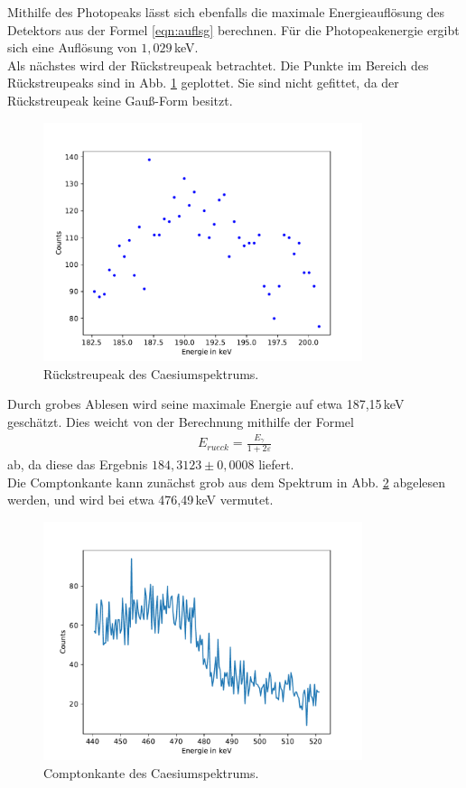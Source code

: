     Mithilfe des Photopeaks lässt sich ebenfalls die maximale Energieauflösung
    des Detektors aus der Formel \eqref{eqn:auflsg}
    berechnen. Für die Photopeakenergie ergibt sich eine Auflösung
    von $1,029\,$keV.\\

    Als nächstes wird der Rückstreupeak betrachtet.
    Die Punkte im Bereich des Rückstreupeaks sind in Abb. \ref{fig:rueck}
    geplottet. Sie sind nicht gefittet, da der Rückstreupeak keine
    Gauß-Form besitzt.

    \begin{figure}[H]
      \centering
      \includegraphics[height=7cm]{germanib/rueck/rueckenergie.pdf}
      \caption{Rückstreupeak des Caesiumspektrums.}
      \label{fig:rueck}
    \end{figure}

    Durch grobes Ablesen wird seine maximale Energie auf etwa 187,15\,keV
    geschätzt.
    Dies weicht von der Berechnung mithilfe der Formel
    \begin{align*}
      E_{rueck} = \frac{E_{\gamma}}{1+2\varepsilon}
    \end{align*}
    ab, da diese das Ergebnis $184,3123\pm 0,0008$ liefert. \\
    Die Comptonkante kann zunächst grob aus dem Spektrum in Abb.
    \ref{fig:comka} abgelesen werden,
    und wird bei etwa 476,49\,keV vermutet.

    \begin{figure}[H]
      \centering
      \includegraphics[height=7cm]{germanib/compton/kanteenergie.pdf}
      \caption{Comptonkante des Caesiumspektrums.}
      \label{fig:comka}
    \end{figure}


